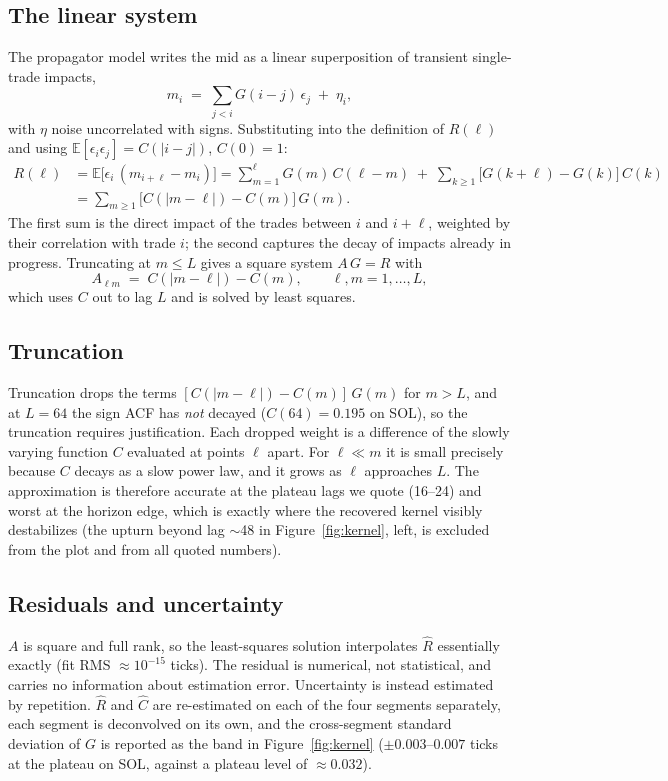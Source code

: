 \documentclass[11pt]{article}
\begin{document}
\subsection{The linear system}

The propagator model \citep{bouchaud2004} writes the mid as a linear superposition of transient single-trade impacts,
\[
m_i \;=\; \sum_{j<i} G(i-j)\,\epsilon_j \;+\; \eta_i,
\]
with $\eta$ noise uncorrelated with signs. Substituting into the definition of $R(\ell)$ and using $\mathbb{E}[\epsilon_i\epsilon_j]=C(|i-j|)$, $C(0)=1$:
\begin{align*}
R(\ell) &= \mathbb{E}\big[\epsilon_i\,(m_{i+\ell}-m_i)\big]
= \sum_{m=1}^{\ell} G(m)\,C(\ell-m) \;+\; \sum_{k\ge 1}\big[G(k+\ell)-G(k)\big]\,C(k)\\
&= \sum_{m\ge 1}\big[C(|m-\ell|)-C(m)\big]\,G(m).
\end{align*}
The first sum is the direct impact of the trades between $i$ and $i+\ell$, weighted by their correlation with trade $i$; the second captures the decay of impacts already in progress. Truncating at $m \le L$ gives a square system $A\,G = R$ with
\[
A_{\ell m} \;=\; C(|m-\ell|) - C(m), \qquad \ell, m = 1,\dots,L,
\]
which uses $C$ out to lag $L$ and is solved by least squares.

\subsection{Truncation}

Truncation drops the terms $[C(|m-\ell|)-C(m)]\,G(m)$ for $m > L$, and at $L=64$ the sign ACF has \emph{not} decayed ($C(64)=0.195$ on SOL), so the truncation requires justification. Each dropped weight is a difference of the slowly varying function $C$ evaluated at points $\ell$ apart. For $\ell \ll m$ it is small precisely because $C$ decays as a slow power law, and it grows as $\ell$ approaches $L$. The approximation is therefore accurate at the plateau lags we quote (16--24) and worst at the horizon edge, which is exactly where the recovered kernel visibly destabilizes (the upturn beyond lag $\sim$48 in Figure~\ref{fig:kernel}, left, is excluded from the plot and from all quoted numbers).

\subsection{Residuals and uncertainty}

$A$ is square and full rank, so the least-squares solution interpolates $\hat{R}$ essentially exactly (fit RMS $\approx 10^{-15}$ ticks). The residual is numerical, not statistical, and carries no information about estimation error. Uncertainty is instead estimated by repetition. $\hat{R}$ and $\hat{C}$ are re-estimated on each of the four segments separately, each segment is deconvolved on its own, and the cross-segment standard deviation of $G$ is reported as the band in Figure~\ref{fig:kernel} ($\pm 0.003$--$0.007$ ticks at the plateau on SOL, against a plateau level of $\approx 0.032$).
\end{document}

